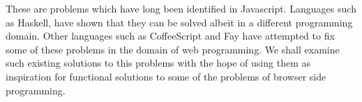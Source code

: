 These are problems which have long been identified in Javascript. Languages such
as Haskell, have shown that they can be solved albeit in a different programming domain.
Other languages such as CoffeeScript and Fay have attempted to fix some of these 
problems in the domain of web programming. We shall examine such existing solutions
to this problems with the hope of using them as inspiration for functional solutions
to some of the problems of browser side programming.